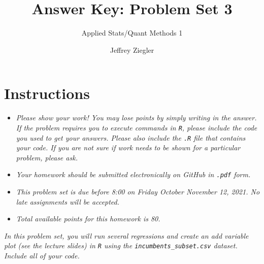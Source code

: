 \documentclass[12pt,letterpaper]{article}
\title{Answer Key: Problem Set 3}
\date{Jeffrey Ziegler}
\author{Applied Stats/Quant Methods 1}
\begin{document}
	\maketitle
	
	\section*{Instructions}
	\begin{itemize}
		\item \textit{Please show your work! You may lose points by simply writing in the answer. If the problem requires you to execute commands in \texttt{R}, please include the code you used to get your answers. Please also include the \texttt{.R} file that contains your code. If you are not sure if work needs to be shown for a particular problem, please ask.}
		\item \textit{Your homework should be submitted electronically on GitHub in \texttt{.pdf} form.}
		\item \textit{This problem set is due before 8:00 on Friday October November 12, 2021. No late assignments will be accepted.}
		\item \textit{Total available points for this homework is 80.}
	\end{itemize}
	\vspace{.25cm}
	
	\noindent \emph{In this problem set, you will run several regressions and create an add variable plot (see the lecture slides) in \texttt{R} using the \texttt{incumbents\_subset.csv} dataset. Include all of your code.}
	
	\vspace{.5cm}
\end{document}
